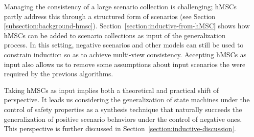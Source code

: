 Managing the consistency of a large scenario collection is challenging; hMSCs partly address this through a structured form of scenarios (see Section \ref{subsection:background-hmsc}). Section~\ref{section:inductive-from-hMSC} shows how hMSCs can be added to scenario collections as input of the generalization process. In this setting, negative scenarios and other models can still be used to constrain induction so as to achieve multi-view consistency. Accepting hMSCs as input also allows us to remove some assumptions about input scenarios the were required by the previous algorithms.

Taking hMSCs as input implies both a theoretical and practical shift of perspective. It leads us considering the generalization of state machines under the control of safety properties as a synthesis technique that naturally succeeds the generalization of positive scenario behaviors under the control of negative ones. This perspective is further discussed in Section~\ref{section:inductive-discussion}.

